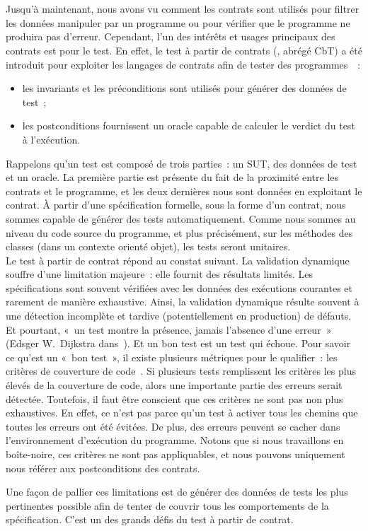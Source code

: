 \section{}
\label{section:sota:cbt}

Jusqu'à maintenant, nous avons vu comment les contrats sont utilisés pour
{\strong filtrer} les données manipuler par un programme ou pour vérifier que le
programme ne produira pas d'erreur. Cependant, l'un des intérêts et usages
principaux des contrats est pour le {\strong test}. En effet, le {\strong test à
partir de contrats} (, abrégé CbT) a été
introduit pour exploiter les langages de contrats afin de tester des
programmes~~:

\begin{itemize}

\item les invariants et les préconditions sont utilisés pour {\strong générer
des données} de test~;

\item les postconditions {\strong fournissent un oracle} capable de calculer le
verdict du test à l'exécution.

\end{itemize}

Rappelons qu'un test est composé de trois parties~: un SUT, des données de test
et un oracle. La première partie est présente du fait de la proximité entre les
contrats et le programme, et les deux dernières nous sont données en exploitant
le contrat. À partir d'une spécification formelle, sous la forme d'un contrat,
nous sommes capable de générer des tests automatiquement. Comme nous sommes au
niveau du code source du programme, et plus précisément, sur les méthodes des
classes (dans un contexte orienté objet), les tests seront {\strong unitaires}. \\

Le test à partir de contrat répond au constat suivant. La validation dynamique
souffre d'une limitation majeure~: elle fournit des résultats limités. Les
spécifications sont souvent vérifiées avec les données des exécutions courantes
et rarement de manière exhaustive. Ainsi, la validation dynamique résulte
souvent à une détection incomplète et tardive (potentiellement en production) de
défauts. Et pourtant, «~un test montre la présence, jamais l'absence d'une
erreur~» (Edsger W.~Dijkstra dans~). Et un bon test est un test
qui échoue.  Pour savoir ce qu'est un «~bon test~», il existe plusieurs
métriques pour le qualifier~: les critères de couverture de
code~. Si plusieurs tests remplissent
les critères les plus élevés de la couverture de code, alors une importante
partie des erreurs serait détectée. Toutefois, il faut être conscient que ces
critères ne sont pas non plus exhaustives. En effet, ce n'est pas parce qu'un
test à activer tous les chemins que toutes les erreurs ont été évitées. De plus,
des erreurs peuvent se cacher dans l'environnement d'exécution du programme.
Notons que si nous travaillons en boîte-noire, ces critères ne sont pas
appliquables, et nous pouvons uniquement nous référer aux postconditions des
contrats.

Une façon de pallier ces limitations est de générer des données de tests les
plus pertinentes possible afin de tenter de couvrir tous les comportements de la
spécification. C'est un des grands défis du test à partir de contrat.
